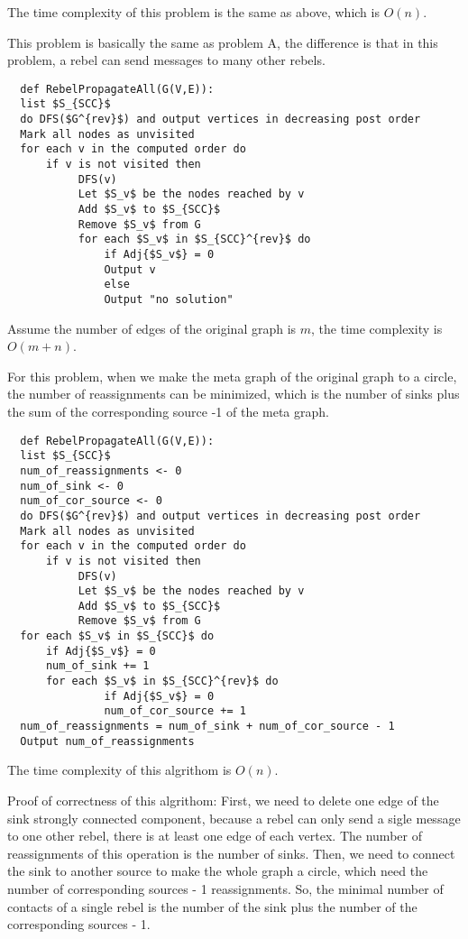 \documentclass[12pt,a4paper]{article}
\newcommand{\question}[1]{\bigskip\noindent{\textbf{Q{#1} solution}}}
\begin{document}
The time complexity of this problem is the same as above, which is $O(n)$.

\question{24.C}

This problem is basically the same as problem A, the difference is that in this problem, a rebel can send messages to many other rebels.

\begin{lstlisting}
  def RebelPropagateAll(G(V,E)):
  list $S_{SCC}$
  do DFS($G^{rev}$) and output vertices in decreasing post order
  Mark all nodes as unvisited
  for each v in the computed order do
      if v is not visited then 
           DFS(v)
           Let $S_v$ be the nodes reached by v
           Add $S_v$ to $S_{SCC}$
           Remove $S_v$ from G
           for each $S_v$ in $S_{SCC}^{rev}$ do
               if Adj{$S_v$} = 0
               Output v
               else
               Output "no solution"
\end{lstlisting}

Assume the number of edges of the original graph is $m$, the time complexity is $O(m+n)$.

\question{24.D}

For this problem, when we make the meta graph of the original graph to a circle, the number of reassignments can be minimized, which is the number of sinks plus the sum of the corresponding source -1 of the meta graph.

\begin{lstlisting}
  def RebelPropagateAll(G(V,E)):
  list $S_{SCC}$
  num_of_reassignments <- 0
  num_of_sink <- 0
  num_of_cor_source <- 0
  do DFS($G^{rev}$) and output vertices in decreasing post order
  Mark all nodes as unvisited
  for each v in the computed order do
      if v is not visited then 
           DFS(v)
           Let $S_v$ be the nodes reached by v
           Add $S_v$ to $S_{SCC}$
           Remove $S_v$ from G
  for each $S_v$ in $S_{SCC}$ do
      if Adj{$S_v$} = 0
      num_of_sink += 1
      for each $S_v$ in $S_{SCC}^{rev}$ do
               if Adj{$S_v$} = 0
               num_of_cor_source += 1
  num_of_reassignments = num_of_sink + num_of_cor_source - 1
  Output num_of_reassignments        
\end{lstlisting}

The time complexity of this algrithom is $O(n)$.

Proof of correctness of this algrithom:
First, we need to delete one edge of the sink strongly connected component, because a rebel can only send a sigle message to one other rebel, there is at least one edge of each vertex. The number of reassignments of this operation is the number of sinks.
Then, we need to connect the sink to another source to make the whole graph a circle, which need the number of corresponding sources - 1 reassignments. So, the minimal number of contacts of a single rebel is the number of the sink plus the number of the corresponding sources - 1.
\end{document}
